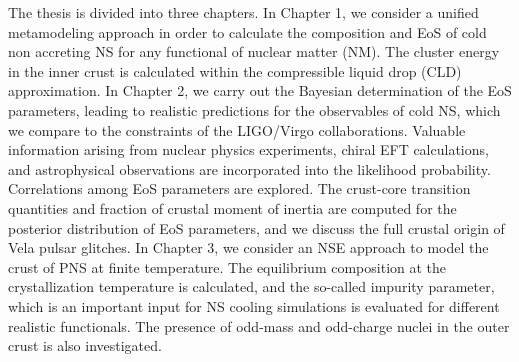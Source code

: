 The thesis is divided into three chapters. 
In Chapter 1, we consider a unified
metamodeling approach in order to calculate the composition and EoS of cold non
accreting NS for any functional of nuclear matter (NM). The cluster energy in
the inner crust is calculated within the compressible liquid drop (CLD)
approximation. 
In Chapter 2, we carry out the Bayesian determination of the EoS 
parameters, leading to realistic predictions for the observables of cold NS,
which we compare to the constraints of the LIGO/Virgo collaborations.
Valuable information arising from nuclear physics experiments, chiral EFT 
calculations, and astrophysical observations are incorporated into the 
likelihood probability. Correlations among EoS parameters are 
explored. The crust-core transition quantities and fraction of crustal moment
of inertia are computed for the posterior distribution of EoS parameters, and 
we discuss the full crustal origin of Vela pulsar glitches.
In Chapter 3, we consider an NSE approach to model the crust of PNS at 
finite temperature. The equilibrium composition at the crystallization 
temperature is calculated, and the so-called impurity parameter, which is an 
important input for NS cooling simulations is evaluated for different realistic 
functionals. The presence of odd-mass and odd-charge nuclei in the outer crust
is also investigated.

\clearpage\thispagestyle{empty}
